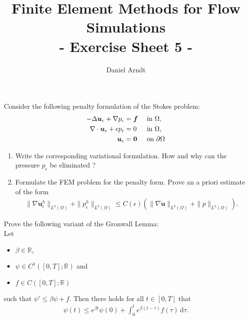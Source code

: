 \documentclass[12pt]{article}
\newcommand{\bu}{\boldsymbol{u}}
\newenvironment{exercise}[2][Exercise]{\begin{trivlist}
\item[\hskip \labelsep {\bfseries #1}\hskip \labelsep {\bfseries #2.}]}{\end{trivlist}}
\begin{document}
 
\title{Finite Element Methods for Flow Simulations\\ - Exercise Sheet 5 -}
\author{Daniel Arndt}
\date{}
 
\maketitle

\begin{exercise}{9}
Consider the following penalty formulation of the Stokes problem:
\begin{align*}
\hfill&&-\Delta \bu_\epsilon + \nabla p_\epsilon &= \boldsymbol{f} &&\text{ in } \Omega, &&\hfill\\
\hfill&&\nabla \cdot \bu_\epsilon + \epsilon p_\epsilon &= 0       &&\text{ in } \Omega, &&\hfill\\
\hfill&&\bu_\epsilon &= \boldsymbol{0} &&\text{ on } \partial\Omega && \hfill
 \end{align*}
 \begin{enumerate}
\item Write the corresponding variational formulation. How and why can the pressure $p_\epsilon$ be eliminated ?
\item Formulate the FEM problem for the penalty form. Prove an a priori estimate of the form
\begin{align*}
\|\nabla \bu^h_\epsilon\|_{L^2 (\Omega)} + \|p^h_\epsilon\|_{L^2(\Omega)} 
\leq C(\epsilon)(\|\nabla \bu\|_{L^2(\Omega)} +\|p\|_{L^2(\Omega)}).
\end{align*}
\end{enumerate}


\end{exercise}

\begin{exercise}{10}
Prove the following variant of the Gronwall Lemma:\\
Let 
\begin{itemize}
 \item $\beta \in \mathbb{R}$,
 \item $\psi \in C^1([0, T ]; \mathbb{R})$ and 
 \item $f \in C([0, T ]; \mathbb{R})$ 
\end{itemize}
such that 
$\psi' \leq \beta \psi + f$. Then there holds for all $t \in [0, T ]$ that
\begin{align*}
\psi(t) \leq e^{\beta t}\psi(0) + \int_0^t e^{\beta(t-\tau )}f (\tau )\, \mathrm{d}\tau.
\end{align*}
\end{exercise}
\end{document}
